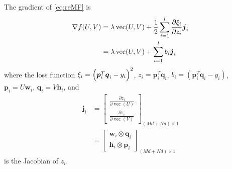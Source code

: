 \documentclass[11pt,twoside]{article}
\newcommand{\bsym}[1]{\ensuremath{\boldsymbol{#1}}}
\newcommand{\bw}{\ensuremath{\bsym{w}}}
\newcommand{\bj}{\ensuremath{\bsym{j}}}
\newcommand{\bp}{\ensuremath{\bsym{p}}}
\newcommand{\bq}{\ensuremath{\bsym{q}}}
\newcommand{\bh}{\ensuremath{\bsym{h}}}
\DeclareMathOperator*{\vectorize}{vec}
\begin{document}
The gradient of \eqref{eq:reMF} is
\begin{align}
    \nabla f(U, V) &= \lambda \vectorize(U, V) + \frac{1}{2}\sum_{i=1}^{l} \pdv{\xi_i}{z_i} \bj_i \nonumber\\
    &= \lambda \vectorize(U, V) + \sum_{i=1}^{l}b_i \bj_i
    \label{eq:Grad}
\end{align}
where the loss function $\xi_i = \Bigl(\bp_i^T\bq_i-y_i\Bigr)^2$, $z_i = \bp_i^T\bq_i$, $b_i = (\bp_i^T\bq_i-y_i)$, $\bp_i = U\bw_i$, $\bq_i = V\bh_i$, and
\begin {align}
\bj_i &= \begin{bmatrix} \frac{\partial z_i}{\partial \vectorize(U)} \\ \frac{\partial z_i}{\partial \vectorize(V)} \end{bmatrix}_{(Md+Nd)\times 1}\nonumber \\
&= \begin{bmatrix} \bw_i\otimes \bq_i \\ \bh_i\otimes \bp_i \end{bmatrix}_{(Md+Nd)\times 1}
\label{eq:Jacob}
\end{align}
is the Jacobian of $z_i$.
\end{document}
